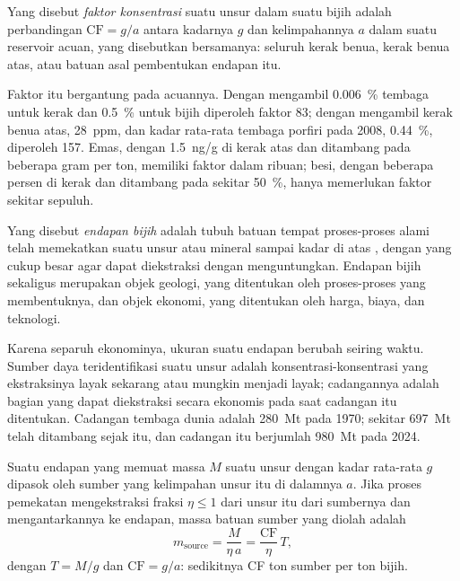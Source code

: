 \begin{definition}\label{def:b2:ore-deposits:cf}
Yang disebut \emph{faktor konsentrasi} suatu unsur dalam suatu bijih adalah perbandingan
$\mathrm{CF} = g/a$ antara kadarnya $g$ dan kelimpahannya $a$ dalam suatu reservoir acuan, yang disebutkan bersamanya:
seluruh kerak benua, kerak benua atas, atau batuan asal pembentukan endapan itu.
\end{definition}

Faktor itu bergantung pada acuannya. Dengan mengambil \qty{0.006}{\percent} tembaga untuk kerak dan
\qty{0.5}{\percent} untuk bijih diperoleh faktor 83; dengan mengambil kerak benua atas,
\qty{28}{ppm}, dan kadar rata-rata tembaga porfiri pada 2008, \qty{0.44}{\percent}, diperoleh 157. Emas,
dengan \qty{1.5}{ng/g} di kerak atas dan ditambang pada beberapa gram per ton, memiliki faktor dalam
ribuan; besi, dengan beberapa persen di kerak dan ditambang pada sekitar \qty{50}{\percent}, hanya memerlukan
faktor sekitar sepuluh.

\begin{definition}\label{def:b2:ore-deposits:deposit}
Yang disebut \emph{endapan bijih} adalah tubuh batuan tempat proses-proses alami telah
memekatkan suatu unsur atau mineral sampai kadar di atas , dengan  yang cukup besar
agar dapat diekstraksi dengan menguntungkan. Endapan bijih sekaligus merupakan objek geologi, yang ditentukan oleh proses-proses yang
membentuknya, dan objek ekonomi, yang ditentukan oleh harga, biaya, dan teknologi.
\end{definition}

Karena separuh ekonominya, ukuran suatu endapan berubah seiring waktu. Sumber daya teridentifikasi suatu unsur
adalah konsentrasi-konsentrasi yang ekstraksinya layak sekarang atau mungkin menjadi layak; cadangannya
adalah bagian yang dapat diekstraksi secara ekonomis pada saat cadangan itu ditentukan. Cadangan tembaga dunia
adalah \qty{280}{Mt} pada 1970; sekitar \qty{697}{Mt} telah ditambang sejak itu, dan cadangan itu
berjumlah \qty{980}{Mt} pada 2024.

\begin{proposition}\label{prop:b2:ore-deposits:mass-balance}
Suatu endapan yang memuat massa $M$ suatu unsur dengan kadar rata-rata $g$ dipasok oleh sumber yang
kelimpahan unsur itu di dalamnya $a$. Jika proses pemekatan mengekstraksi fraksi $\eta \leq 1$ dari
unsur itu dari sumbernya dan mengantarkannya ke endapan, massa batuan sumber yang diolah adalah
\begin{equation}
m_{\mathrm{source}} = \frac{M}{\eta\,a} = \frac{\mathrm{CF}}{\eta}\, T ,
\label{eq:b2:ore-deposits:mass-balance}
\end{equation}
dengan $T = M/g$  dan $\mathrm{CF} = g/a$: sedikitnya CF ton sumber per ton bijih.
\end{proposition}

